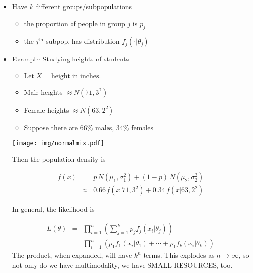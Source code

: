\documentclass[captions=tableheading]{scrbook}
\begin{document}
\begin{itemize}
\item Have $k$ different groups/subpopulations
\begin{itemize}
\item the proportion of people in group $j$ is $p_{j}$
\item the $j^{\mathrm{th}}$ subpop. has distribution $f_{j}(\cdot |\theta_{j})$
\end{itemize}
\end{itemize}
\begin{itemize}

\item Example: Studying heights of students\\
\label{sec-1_2_3_1}%
\begin{itemize}
\item Let \(X = \mbox{height in inches}  \).
\item Male heights $\approx N(71, 3^2)$
\item Female heights $\approx N(63, 2^2)$
\item Suppose there are 66\% males, 34\% females
\end{itemize}

\begin{center}

\texttt{[image: img/normalmix.pdf]}

\end{center}

Then the population density is 

\begin{eqnarray*}
f(x) & = & p\,N(\mu_{1},\sigma_{1}^{2}) + (1 - p)\,N(\mu_{2},\sigma_{2}^{2})\\
     & \approx & 0.66\,f(x|71, 3^{2}) + 0.34\,f(x|63,2^{2})
\end{eqnarray*}

In general, the likelihood is 

\begin{eqnarray*}
L(\theta) & = & \prod_{i=1}^{n} \left( \sum_{j=1}^{k}p_{j}f_{j}(x_{i}|\theta_{j}) \right) \\
     & = & \prod_{i=1}^{n} \left( p_{1}f_{1}(x_{i}|\theta_{1}) + \cdots + p_{1}f_{k}(x_{i}|\theta_{k}) \right)
\end{eqnarray*}
The product, when expanded, will have $k^{n}$ terms.  This explodes as $n \to \infty$, so not only do we have multimodality, we have SMALL RESOURCES, too.

\end{itemize} %
\end{document}
